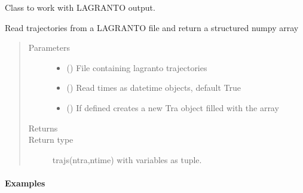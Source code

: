 \documentclass[a4paper,10pt,english]{sphinxmanual}
\begin{document}
\begin{fulllineitems}
\label{\detokenize{lagranto:lagranto.Tra}}
Class to work with LAGRANTO output.

Read trajectories from a LAGRANTO file and return a structured numpy array
\begin{quote}\begin{description}
\item[{Parameters}] \leavevmode\begin{itemize}
\item {} 
 () \textendash{} File containing lagranto trajectories

\item {} 
 () \textendash{} Read times as datetime objects, default True

\item {} 
 () \textendash{} If defined creates a new Tra object filled with the array

\end{itemize}

\item[{Returns}] \leavevmode
{}

\item[{Return type}] \leavevmode
trajs(ntra,ntime) with variables as tuple.

\end{description}\end{quote}
\paragraph{Examples}

\begin{sphinxVerbatim}[commandchars=\\\{\}]
     
     
   
   \PYG{p}{[}\PYG{p}{]}\PYG{p}{[}\PYG{p}{]}  
\end{sphinxVerbatim}


\end{fulllineitems}
\end{document}
